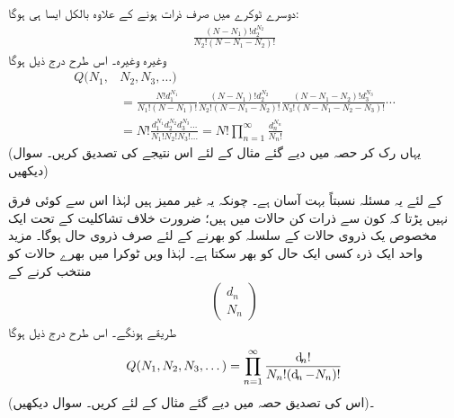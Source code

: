 دوسرے ٹوکرے میں صرف  ذرات ہونے کے علاوہ بالکل ایسا ہی ہوگا:
\begin{align*}
\frac{(N - N_1) ! d_2^{N_2}}{N_2 ! (N - N_1 - N_2) !}
\end{align*}
وغیرہ وغیرہ۔ اس طرح درج ذیل ہوگا 
\begin{align}\label{مساوات_متماثل_قابل_ممیز_اجتماعات}
Q (N_1 , &N_2 , N_3 , \dotsc) \nonumber\\
&= \frac{N ! d_1^{N_1}}{N_1 ! (N - N_1) !} \frac{(N - N_1) ! d_2^{N_2}}{N_2 ! (N - N_1 - N_2) !} \frac{(N - N_1 - N_2) ! d_3^{N_3}}{N_3 ! (N - N_1 - N_2 - N_3) !} \cdots \nonumber\\
&= N ! \frac{d_1^{N_1} d_2^{N_2} d_3^{N_3} \dotsc}{N_1 ! N_2 ! N_3 ! \dotsc} = N! \prod_{n = 1}^{\infty} \frac{d_n^{N_n}}{N_n !}
\end{align}
(یہاں رک کر حصہ  میں دیے گئے مثال کے لئے اس نتیجے کی تصدیق کریں۔ سوال  دیکھیں)

 کے لئے یہ مسئلہ نسبتاً بہت آسان ہے۔ چونکہ یہ غیر ممیز ہیں لہٰذا اس سے کوئی فرق نہیں پڑتا کہ کون سے ذرات کن حالات میں ہیں؛ ضرورت خلاف تشاکلیت کے تحت ایک مخصوص یک ذروی حالات کے سلسلہ کو بھرنے کے لئے صرف   ذروی حال ہوگا۔ مزید واحد ایک ذرہ کسی ایک حال کو بھر سکتا ہے۔ لہٰذا  ویں ٹوکرا میں  بهرے حالات کو منتخب کرنے کے 
\begin{align*}
\begin{pmatrix}
d_n \\
N_n
\end{pmatrix}
\end{align*}
طریقے ہونگے۔ اس طرح درج ذیل ہوگا 
\begin{align}\label{مساوات_متماثل_فرمیان_اجتماعات}
Q (N_1 , N_2 , N_3 , \dotsc ) = \prod_{n = 1}^{\infty} \frac{\dif_n !}{N_n ! (\dif_n - N_n) !}
\end{align}
(اس کی تصدیق حصہ  میں دیے گئے مثال کے لئے کریں۔ سوال  دیکھیں)۔

